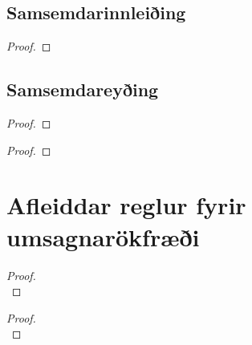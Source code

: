 \subsection*{Samsemdarinnleiðing}

\begin{proof}
	 
\end{proof}


\subsection*{Samsemdareyðing}

\begin{multicols}{2}
\begin{proof}
	 
\end{proof}
\begin{proof}
	 
\end{proof}
\end{multicols}

\section{Afleiddar reglur fyrir umsagnarökfræði}
\begin{multicols}{2}
\begin{proof}

\\	
\end{proof}
\begin{proof}

\\	
\end{proof}
\end{multicols}


